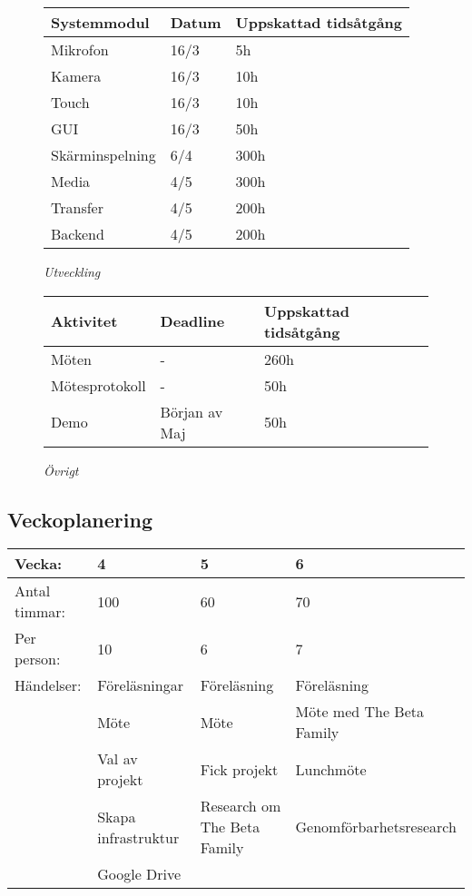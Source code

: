 \begin{figure}[H]
\centering
\begin{tabular}{ | l | l | l |}
  \hline
  \textbf{Systemmodul} & \textbf{Datum} & \textbf{Uppskattad tidsåtgång} \\ \hline
  Mikrofon & 16/3 & 5h \\ \hline
  Kamera & 16/3 & 10h  \\ \hline
  Touch & 16/3 & 10h \\ \hline
  GUI & 16/3 & 50h \\ \hline
  Skärminspelning & 6/4 & 300h \\ \hline
  Media & 4/5 & 300h \\ \hline
  Transfer & 4/5 & 200h \\ \hline
  Backend & 4/5 & 200h \\ \hline
\end{tabular}
\caption*{\textit{Utveckling}}
\end{figure}

\begin{figure}[H]
\centering
\begin{tabular}{ | l | l | l | }
  \hline
  \textbf{Aktivitet} & \textbf{Deadline} & \textbf{Uppskattad tidsåtgång} \\ \hline
  Möten & - & 260h \\ \hline
  Mötesprotokoll & - & 50h \\ \hline
  Demo & Början av Maj & 50h \\ \hline
\end{tabular}
\caption*{\textit{Övrigt}}
\end{figure}

\subsection{Veckoplanering}

\begin{tabular}{ | p{65pt} || p{110pt} | p{110pt} | p{110pt} |}
  \hline
  Vecka: & 4 & 5 & 6 \\ \hline
  Antal timmar: & 100 & 60 & 70 \\ \hline
  Per person: & 10 & 6 & 7 \\ \hline
  Händelser: & Föreläsningar & Föreläsning & Föreläsning \\ \hline
  & Möte & Möte & Möte med The Beta Family  \\ \hline
  & Val av projekt & Fick projekt & Lunchmöte\\ \hline
  & Skapa infrastruktur & Research om The Beta Family & Genomförbarhetsresearch\\ \hline
  & Google Drive &  & \\ \hline
\end{tabular}

